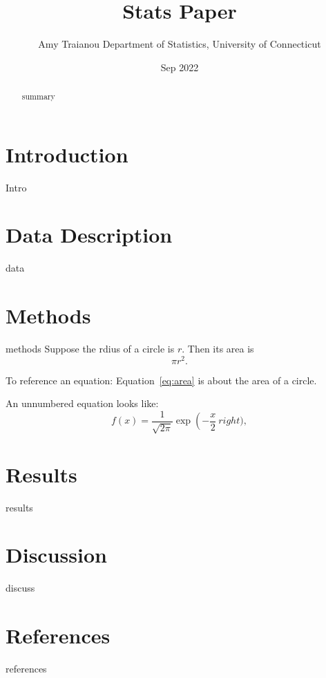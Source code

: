 \documentclass[12pt, letterpaper, titlepage]{article}
\title{Stats Paper}
\author{Amy Traianou
  Department of Statistics, University of Connecticut\\
  }
\date{Sep 2022}
\begin{document}
\maketitle

\begin{abstract}
summary
\end{abstract}

\section*{Introduction}
Intro

\section*{Data Description}
data

\section*{Methods}
methods 
Suppose the rdius of a circle is $r$. Then its area is 
\begin{equation}
\label{eq:area}
\pi r^2.
\end{equation}

To reference an equation:
Equation~\eqref{eq:area} is about the area of a circle. 

An unnumbered equation looks like:
\[
f(x)=\frac{1}{\sqrt{2\pi}}\exp\left( - \frac{x}{2} \ right),
\]


\section*{Results}
results


\section*{Discussion}
discuss

\section*{References}
references
\end{document}
